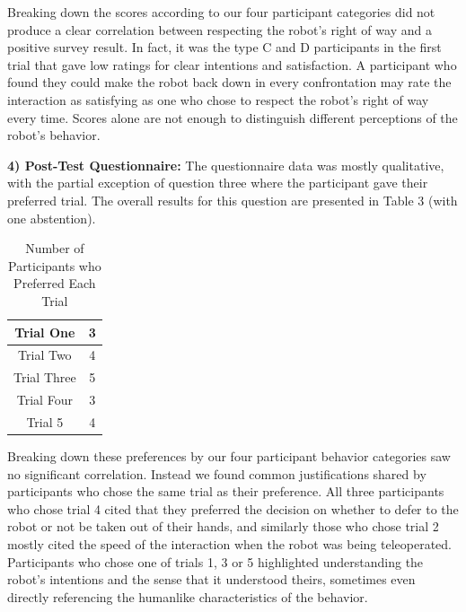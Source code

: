 \documentclass[letterpaper, 10 pt, conference]{ieeeconf}  %
\begin{document}
Breaking down the scores according to our four participant categories did not produce a clear correlation between respecting the robot's right of way and a positive survey result. In fact, it was the type C and D participants in the first trial that gave low ratings for clear intentions and satisfaction. A participant who found they could make the robot back down in every confrontation may rate the interaction as satisfying as one who chose to respect the robot's right of way every time. Scores alone are not enough to distinguish different perceptions of the robot's behavior.

\textbf{4) Post-Test Questionnaire:} The questionnaire data was mostly qualitative, with the partial exception of question three where the participant gave their preferred trial. The overall results for this question are presented in Table 3 (with one abstention).

\begin{table}[h]
\caption{Number of Participants who Preferred Each Trial }
\label{Preferences}
\begin{center}
\begin{tabular}{|c||c|}
\hline
Trial One & 3\\
\hline
Trial Two & 4\\
\hline
Trial Three & 5\\
\hline
Trial Four & 3\\
\hline
Trial 5 & 4\\
\hline
\end{tabular}
\end{center}
\end{table}

Breaking down these preferences by our four participant behavior categories saw no significant correlation. Instead we found common justifications shared by participants who chose the same trial as their preference. All three participants who chose trial 4 cited that they preferred the decision on whether to defer to the robot or not be taken out of their hands, and similarly those who chose trial 2 mostly cited the speed of the interaction when the robot was being teleoperated. Participants who chose one of trials 1, 3 or 5 highlighted understanding the robot's intentions and the sense that it understood theirs, sometimes even directly referencing the humanlike characteristics of the behavior.

\end{document}

